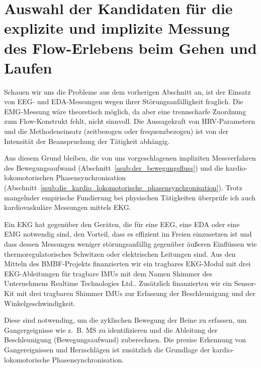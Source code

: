 

\section{Auswahl der Kandidaten für die explizite und implizite Messung des Flow-Erlebens beim Gehen und Laufen} 

\label{sec:auswahl_der_kandidaten_fur_die_explizite_und_implizite_messung_des_flow_erlebens_beim_gehen_und_laufen}

Schauen wir uns die Probleme aus dem vorherigen Abschnitt an, ist der Einsatz von \ac{EEG}- und \ac{EDA}-Messungen wegen ihrer Störungsanfälligkeit fraglich. Die \ac{EMG}-Messung wäre theoretisch möglich, da aber eine trennscharfe Zuordnung zum Flow-Konstrukt fehlt, nicht sinnvoll. Die Aussagekraft von \ac{HRV}-Parametern und die Methodeneinsatz (zeitbezogen oder frequenzbezogen) ist von der Intensität der Beanspruchung der Tätigkeit abhängig.

Aus diesem Grund bleiben, die von uns vorgeschlagenen impliziten Messverfahren des Bewegungsaufwand (Abschnitt~\ref{ssub:der_bewegungsfluss}) und die kardio-lokomotorischen Phasensynchronisation (Abschnitt~\ref{ssub:die_kardio_lokomotorische_phasensynchronisation}). Trotz mangelnder empirische Fundierung bei physischen Tätigkeiten überprüfe ich auch kardiovaskuläre Messungen mittels \ac{EKG}. 

Ein \ac{EKG} hat gegenüber den Geräten, die für eine \ac{EEG}, eine \ac{EDA} oder eine \ac{EMG} notwendig sind, den Vorteil, dass es effizient im Freien einzusetzen ist und dass dessen Messungen weniger störungsanfällig gegenüber äußeren Einflüssen wie thermoregulatorisches Schwitzen oder elektrischen Leitungen sind. Aus den Mitteln des \acs{BMBF}-Projekts finanzierten wir ein tragbares \ac{EKG}-Modul mit drei \ac{EKG}-Ableitungen für tragbare \acp{IMU} mit dem Namen Shimmer des Unternehmens Realtime Technologies Ltd.. Zusätzlich finanzierten wir ein Sensor-Kit mit drei tragbaren Shimmer \acp{IMU} zur Erfassung der Beschleunigung und der Winkelgeschwindigkeit.

Diese sind notwending, um die zyklischen Bewegung der Beine zu erfassen, um Gangergeignisse wie z.~B. \ac{MS} zu identifizieren und die Ableitung der Beschleunigung (Bewegungsaufwand) zuberechnen. Die prezise Erkennung von Gangereignissen und Herzschlägen ist zusätzlich die Grundlage der kardio-lokomotorische Phasensynchronisation. 

